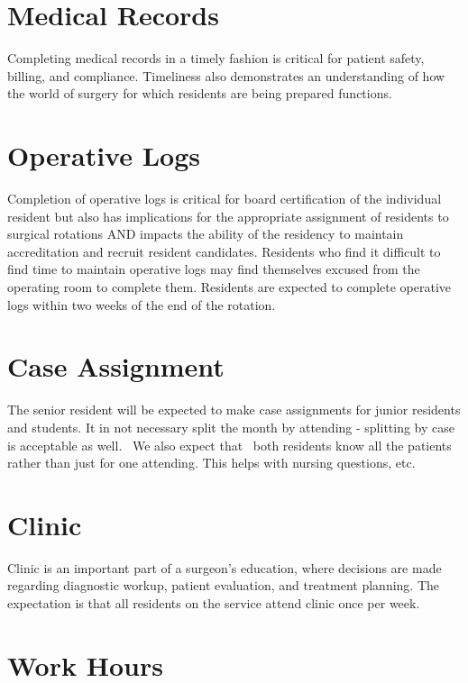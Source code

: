 \documentclass[
]{book}
\begin{document}
\hypertarget{medical-records}{%
\section{Medical Records}\label{medical-records}}

Completing medical records in a timely fashion is critical for patient safety, billing, and compliance. Timeliness also demonstrates an understanding of how the world of surgery for which residents are being prepared functions.

\hypertarget{operative-logs}{%
\section{Operative Logs}\label{operative-logs}}

Completion of operative logs is critical for board certification of the individual resident but also has implications for the appropriate assignment of residents to surgical rotations AND impacts the ability of the residency to maintain accreditation and recruit resident candidates. Residents who find it difficult to find time to maintain operative logs may find themselves excused from the operating room to complete them. Residents are expected to complete operative logs within two weeks of the end of the rotation.

\hypertarget{case-assignment}{%
\section{Case Assignment}\label{case-assignment}}

The senior resident will be expected to make case assignments for junior residents and students. It in not necessary split the month by attending - splitting by case is acceptable as well.~ We also expect that~ both residents know all the patients rather than just for one attending. This helps with nursing questions, etc.

\hypertarget{clinic}{%
\section{Clinic}\label{clinic}}

Clinic is an important part of a surgeon's education, where decisions are made regarding diagnostic workup, patient evaluation, and treatment planning. The expectation is that all residents on the service attend clinic once per week.

\hypertarget{work-hours}{%
\section{Work Hours}\label{work-hours}}
\end{document}
